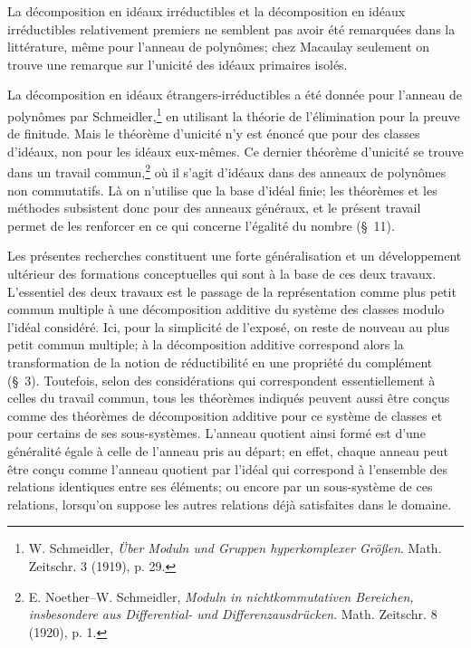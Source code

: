 La décomposition en idéaux irréductibles et la décomposition en idéaux irréductibles relativement premiers ne semblent pas avoir été remarquées dans la littérature, même pour l'anneau de polynômes; chez Macaulay seulement on trouve une remarque sur l'unicité des idéaux primaires isolés.

La décomposition en idéaux étrangers-irréductibles a été donnée pour l'anneau de polynômes par Schmeidler,\footnote{W. Schmeidler, \emph{Über Moduln und Gruppen hyperkomplexer Größen}. Math. Zeitschr. 3 (1919), p. 29.} en utilisant la théorie de l'élimination pour la preuve de finitude. Mais le théorème d'unicité n'y est énoncé que pour des classes d'idéaux, non pour les idéaux eux-mêmes. Ce dernier théorème d'unicité se trouve dans un travail commun,\footnote{E. Noether--W. Schmeidler, \emph{Moduln in nichtkommutativen Bereichen, insbesondere aus Differential- und Differenzausdrücken}. Math. Zeitschr. 8 (1920), p. 1.} où il s'agit d'idéaux dans des anneaux de polynômes non commutatifs. Là on n'utilise que la base d'idéal finie; les théorèmes et les méthodes subsistent donc pour des anneaux généraux, et le présent travail permet de les renforcer en ce qui concerne l'égalité du nombre (\S{}~11).

Les présentes recherches constituent une forte généralisation et un développement ultérieur des formations conceptuelles qui sont à la base de ces deux travaux. L'essentiel des deux travaux est le passage de la représentation comme plus petit commun multiple à une décomposition additive du système des classes modulo l'idéal considéré. Ici, pour la simplicité de l'exposé, on reste de nouveau au plus petit commun multiple; à la décomposition additive correspond alors la transformation de la notion de réductibilité en une propriété du complément (\S{}~3). Toutefois, selon des considérations qui correspondent essentiellement à celles du travail commun, tous les théorèmes indiqués peuvent aussi être conçus comme des théorèmes de décomposition additive pour ce système de classes et pour certains de ses sous-systèmes. L'anneau quotient ainsi formé est d'une généralité égale à celle de l'anneau pris au départ; en effet, chaque anneau peut être conçu comme l'anneau quotient par l'idéal qui correspond à l'ensemble des relations identiques entre ses éléments; ou encore par un sous-système de ces relations, lorsqu'on suppose les autres relations déjà satisfaites dans le domaine.


